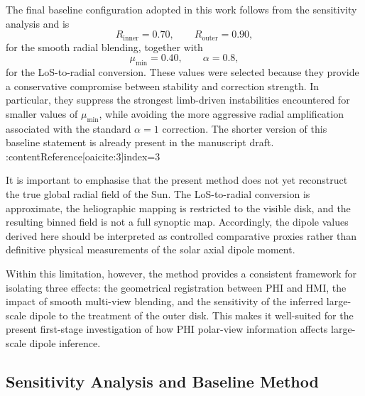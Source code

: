 \documentclass[namedreferences,hyperref,optionalrh]{spr-sola}
\begin{document}

The final baseline configuration adopted in this work follows from the sensitivity analysis and is
\begin{equation}
    R_{\mathrm{inner}} = 0.70,\qquad
    R_{\mathrm{outer}} = 0.90,
\end{equation}
for the smooth radial blending, together with
\begin{equation}
    \mu_{\min}=0.40,\qquad
    \alpha=0.8,
\end{equation}
for the LoS-to-radial conversion. These values were selected because they provide a conservative compromise between stability and correction strength. In particular, they suppress the strongest limb-driven instabilities encountered for smaller values of $\mu_{\min}$, while avoiding the more aggressive radial amplification associated with the standard $\alpha=1$ correction. The shorter version of this baseline statement is already present in the manuscript draft. :contentReference[oaicite:3]{index=3}


It is important to emphasise that the present method does not yet reconstruct the true global radial field of the Sun. The LoS-to-radial conversion is approximate, the heliographic mapping is restricted to the visible disk, and the resulting binned field is not a full synoptic map. Accordingly, the dipole values derived here should be interpreted as controlled comparative proxies rather than definitive physical measurements of the solar axial dipole moment.

Within this limitation, however, the method provides a consistent framework for isolating three effects: the geometrical registration between PHI and HMI, the impact of smooth multi-view blending, and the sensitivity of the inferred large-scale dipole to the treatment of the outer disk. This makes it well-suited for the present first-stage investigation of how PHI polar-view information affects large-scale dipole inference.

\subsection{Sensitivity Analysis and Baseline Method}
\label{sec:sensitivity}
\end{document}

